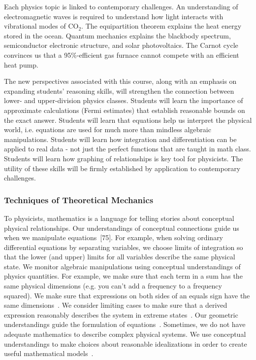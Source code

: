 \documentclass[english,aps,pra,reprint,noshowpacs,superscriptaddress]{revtex4-1}
\begin{document}
Each physics topic is linked to contemporary challenges. An
understanding of electromagnetic waves is required to understand how
light interacts with vibrational modes of CO$_2$. The equipartition
theorem explains the heat energy stored in the ocean. Quantum
mechanics explains the blackbody spectrum, semiconductor electronic
structure, and solar photovoltaics. The Carnot cycle convinces us that
a 95\%-efficient gas furnace cannot compete with an efficient heat
pump.

The new perspectives associated with this course, along with an
emphasis on expanding students' reasoning skills, will strengthen the
connection between lower- and upper-division physics classes. Students
will learn the importance of approximate calculations (Fermi
estimates) that establish reasonable bounds on the exact
answer. Students will learn that equations help us interpret the
physical world, i.e. equations are used for much more than mindless
algebraic manipulations.  Students will learn how integration and
differentiation can be applied to real data - not just the perfect
functions that are taught in math class. Students will learn how
graphing of relationships is key tool for physicists. The utility of
these skills will be firmly established by application to contemporary
challenges.

\subsubsection{Techniques of Theoretical Mechanics}

To physicists, mathematics is a language for telling stories about
conceptual physical relationships.  Our understandings of conceptual
connections guide us when we manipulate
equations~\cite{gire2008resources, bing2007cognitive,
  wittmann2015mathematical}[75].  For example, when solving ordinary
differential equations by separating variables, we choose limits of
integration so that the lower (and upper) limits for all variables
describe the same physical state.  We monitor algebraic manipulations
using conceptual understandings of physics quantities. For example, we
make sure that each term in a sum has the same physical dimensions
(e.g. you can't add a frequency to a frequency squared). We make sure
that expressions on both sides of an equals sign have the same
dimensions~\cite{lenz2016dimensional}. We consider limiting cases to
make sure that a derived expression reasonably describes the system in
extreme states~\cite{singh2002physical}. Our geometric understandings
guide the formulation of equations~\cite{gire2014arrows}. Sometimes,
we do not have adequate mathematics to describe complex physical
systems. We use conceptual understandings to make choices about
reasonable idealizations in order to create useful mathematical
models~\cite{bing2007cognitive}.
\end{document}
